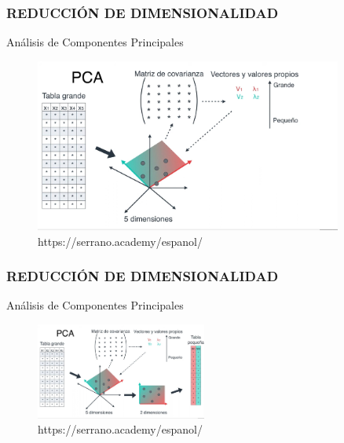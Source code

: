 \documentclass{beamer}
\begin{document}
\begin{frame}
	\frametitle{REDUCCIÓN DE DIMENSIONALIDAD}
	\begin{block}{Análisis de Componentes Principales}	
		\begin{figure}
			\includegraphics[width=0.9\textwidth]{PCA/IMG_3593.jpg}
			\caption{https://serrano.academy/espanol/}
		\end{figure}
	\end{block}
\end{frame}

\begin{frame}
	\frametitle{REDUCCIÓN DE DIMENSIONALIDAD}
	\begin{block}{Análisis de Componentes Principales}	
		\begin{figure}
			\includegraphics[width=0.5\textwidth]{PCA/IMG_3594.jpg}
			\caption{https://serrano.academy/espanol/}
		\end{figure}
	\end{block}
\end{frame}
\end{document}
